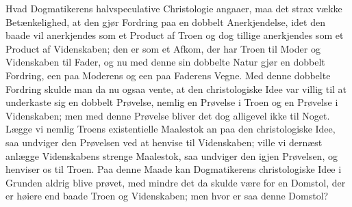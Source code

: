 \documentclass[12pt,a4paper]{book}
\begin{document}
Hvad Dogmatikerens halvspeculative Christologie angaaer, maa det strax
vække Betænkelighed, at den gjør Fordring paa en dobbelt Anerkjendelse,
idet den baade vil anerkjendes som et Product af Troen og dog tillige
anerkjendes som et Product af Videnskaben; den er som et Afkom, der har
Troen til Moder og Videnskaben til Fader, og nu med denne sin dobbelte
Natur gjør en dobbelt Fordring, een paa Moderens og een paa Faderens Vegne.
Med denne dobbelte Fordring skulde man da nu ogsaa vente, at den
christologiske Idee var villig til at underkaste sig en dobbelt Prøvelse,
nemlig en Prøvelse i Troen og en Prøvelse i Videnskaben; men med denne
Prøvelse bliver det dog alligevel ikke til Noget. Lægge vi nemlig Troens
existentielle Maalestok an paa den christologiske Idee, saa undviger den
Prøvelsen ved at henvise til Videnskaben; ville vi dernæst anlægge
Videnskabens strenge Maalestok, saa undviger den igjen Prøvelsen, og
henviser os til Troen. Paa denne Maade kan Dogmatikerens christologiske
Idee i Grunden aldrig blive prøvet, med mindre det da skulde være for en
Domstol, der er høiere end baade Troen og Videnskaben; men hvor er saa
denne Domstol?
\end{document}
